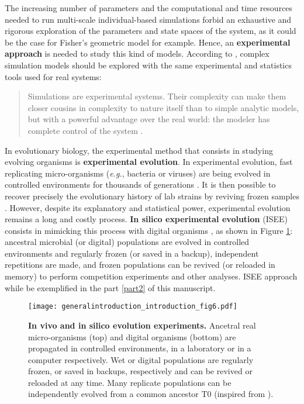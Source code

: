 The increasing number of parameters and the computational and time resources needed to run multi-scale individual-based simulations forbid an exhaustive and rigorous exploration of the parameters and state spaces of the system, as it could be the case for Fisher's geometric model for example.
Hence, an \textbf{experimental approach} is needed to study this kind of models. According to \cite{peck-2004}, complex simulation models should be explored with the same experimental and statistics tools used for real systems:
\begin{quote}
Simulations are experimental systems. Their complexity can make them closer cousins in complexity to nature itself than to simple analytic models, but with a powerful advantage over the real world: the modeler has complete control of the system \citep{peck-2004}.
\end{quote}
In evolutionary biology, the experimental method that consists in studying evolving organisms is \textbf{experimental evolution}. In experimental evolution, fast replicating micro-organisms (\textit{e.g.}, bacteria or viruses) are being evolved in controlled environments for thousands of generations \citep{philippe-2007}. It is then possible to recover precisely the evolutionary history of lab strains by reviving frozen samples \citep{elena-and-lenski-2003}. However, despite its explanatory and statistical power, experimental evolution remains a long and costly process. \textbf{In silico experimental evolution} (ISEE) consists in mimicking this process with digital organisms \citep{hindre-et-al-2012,mozhayskiy-tagkopoulos-2013,batut-et-al-2013}, as shown in Figure \ref{fig:general_introduction:introduction:fig6}: ancestral microbial (or digital) populations are evolved in controlled environments and regularly frozen (or saved in a backup), independent repetitions are made, and frozen populations can be revived (or reloaded in memory) to perform competition experiments and other analyses. ISEE approach while be exemplified in the part \ref{part2} of this manuscript.

\begin{figure}[!ht]
\centering
\texttt{[image: generalintroduction\_introduction\_fig6.pdf]}
\caption[In vivo and in silico evolution experiments.]{{\bf In vivo and in silico evolution experiments.}
Ancetral real micro-organisms (top) and digital organisms (bottom) are propagated in controlled environments, in a laboratory or in a computer respectively. Wet or digital populations are regularly frozen, or saved in backups, respectively and can be revived or reloaded at any time.
Many replicate populations can be independently evolved from a common ancestor T0 (inspired from \citealt{hindre-et-al-2012}).}
\label{fig:general_introduction:introduction:fig6}
\end{figure}

